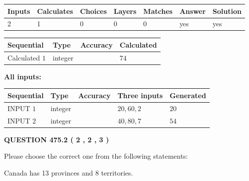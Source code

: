 \documentclass[12pt]{article}
\begin{document}
 

 
   
   
   
   
\noindent\begin{tabular}{|l|l|l|l|l|l|l|}
 \hline
Inputs & Calculates & Choices & Layers & Matches & Answer & Solution \\ \hline
 2  & 
 1  & 
 0
  & 
 0  & 
 0  & 
  yes & 
  yes 
  \\ \hline
 \end{tabular}
   
   
   
   
\noindent{}
   
   
  
  
\noindent\begin{tabular}{|l|l|l|l|}
\hline
 Sequential & Type & Accuracy & Calculated \\ 
\hline
 
 
  Calculated $  1 $ & integer &  & 
  $ 74 $ 
 \\  \hline  
 \end{tabular}
   
   
   
   
\noindent\vspace{0.1in}\hspace{-0.08in} {\textbf{\Large{All inputs: }}}
   
   
  
  
\noindent\begin{tabular}{|l|l|l|l|l|}
\hline
 Sequential & Type & Accuracy & Three inputs & Generated \\ 
\hline
 
 
  INPUT $  1 $ & integer &  & $
 20
 , 
 60
 , 
 2
 $ & $ 20 $ 
 \\  \hline  
 
 
  INPUT $  2 $ & integer &  & $
 40
 , 
 80
 , 
 7
 $ & $ 54 $ 
 \\  \hline  
 \end{tabular}
   
   
  
\vspace{0.2in}
  
{\textbf{\Large{QUESTION
475.2 
 ( 2 , 2 , 3 )
}}}
  
  
Please choose the correct one from the following statements:
 
 
Canada has  13 provinces and  8 territories.
 
\end{document}
